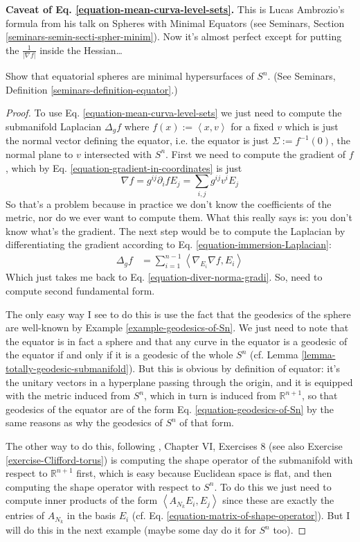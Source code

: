 {\bf Caveat of Eq.
\ref{equation-mean-curva-level-sets}.} This
is
Lucas Ambrozio's formula from his talk on
Spheres with Minimal Equators (see
Seminars, Section
\ref{seminars-semin-secti-spher-minim}).
Now it's almost perfect except for
putting the $\frac{1}{|\nabla f|}$ inside the
Hessian…

\begin{example}
\label{example-equatorial-spheres}
Show that equatorial spheres are minimal
hypersurfaces of $S^n$. (See
Seminars, Definition
\ref{seminars-definition-equator}.)
\end{example}

\begin{proof}
To use Eq.
\ref{equation-mean-curva-level-sets} we just
need to compute
the submanifold Laplacian $\Delta_gf$ where
$f(x):=\left\langle{}x,v\right\rangle{}$ for a fixed
$v$ which is just the normal vector defining
the equator, i.e. the equator is
just  $\Sigma:=f^{-1}(0)$, the normal plane
to $v$ intersected with $S^n$. First
we need to compute the gradient of $f$, which
by Eq.
\ref{equation-gradient-in-coordinates} is
just
$$
\nabla
f=g^{ij}\partial_ifE_j=\sum_{i,j}g^{ij}v^iE_j
$$
So that's a problem because in practice we
don't know the coefficients of the
metric, nor do we ever want to compute them.
What this really says is: you don't
know what's the gradient. The next step would
be to compute the Laplacian by
differentiating the gradient
according to Eq.
\ref{equation-immersion-Laplacian}:
$$
\begin{aligned}
\Delta_gf&=\sum_{i=1}^{n-1}\left\langle{}\nabla_{E_i}
\nabla
f,E_i\right\rangle{}
\end{aligned}
$$
Which just takes me back to Eq.
\ref{equation-diver-norma-gradi}. So, need
to compute second fundamental form.

The only easy way I see to do this is use the
fact that the geodesics of the
sphere are well-known by Example
\ref{example-geodesics-of-Sn}. We just need
to
note that the equator is in fact a sphere and
that any curve in the equator is a
geodesic of the equator if and only if it is
a geodesic of the whole $S^n$ (cf.
Lemma
\ref{lemma-totally-geodesic-submanifold}).
But this is obvious by
definition of equator: it's the unitary
vectors in a hyperplane passing through
the origin, and it is equipped with the
metric induced from $S^n$, which in turn
is induced from $\mathbb{R}^{n+1}$, so that
geodesics of the equator are of the
form Eq. \ref{equation-geodesics-of-Sn} by
the same reasons as why the geodesics
of $S^n$ of that form.

The other way to do this, following
\cite{doc}, Chapter VI, Exercises 8 (see also
Exercise \ref{exercise-Clifford-torus}) is
computing the shape operator of the
submanifold with respect to
$\mathbb{R}^{n+1}$ first, which is easy
because
Euclidean space is flat, and then computing
the shape operator with respect to
$S^n$. To do this we just need to compute
inner products of the form
$\left\langle{}A_{N_k}E_i,E_j\right\rangle{}$ since these are
exactly the entries of $A_{N_k}$
in the basis $E_i$ (cf. Eq.
\ref{equation-matrix-of-shape-operator}). But
I will
do this in the next example (maybe some day
do it for $S^n$ too).
\end{proof}

